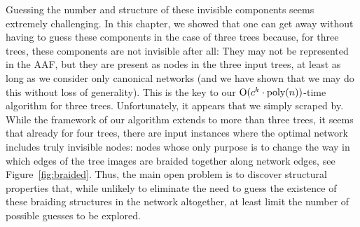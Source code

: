Guessing the number and structure of these invisible components seems extremely challenging. In this chapter, we showed that one can get away without having to guess these components in the case of three trees because, for three trees, these components are not invisible after all: They may not be represented in the AAF, but they are present as nodes in the three input trees, at least as long as we consider only canonical networks (and we have shown that we may do this without loss of generality). This is the key to our $\mathrm{O}(c^k \cdot \text{poly}(n))$-time algorithm for three trees. Unfortunately, it appears that we simply scraped by. While the framework of our algorithm extends to more than three trees, it seems that already for four trees, there are input instances where the optimal network includes truly invisible nodes: nodes whose only purpose is to change the way in which edges of the tree images are braided together along network edges, see Figure~\ref{fig:braided}. Thus, the main open problem is to discover structural properties that, while unlikely to eliminate the need to guess the existence of these braiding structures in the network altogether, at least limit the number of possible guesses to be explored.

